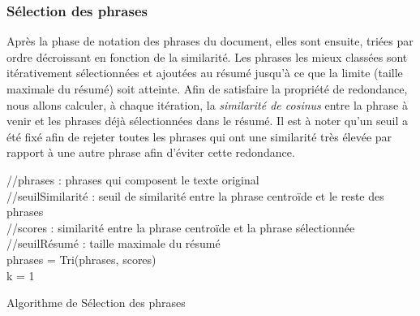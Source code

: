         \subsubsection{Sélection des phrases}
       Après la phase de notation des phrases du document, elles sont ensuite, triées par ordre décroissant en fonction de la similarité. Les phrases les mieux classées sont itérativement sélectionnées et ajoutées au résumé jusqu'à ce que la limite (taille maximale du résumé) soit atteinte. Afin de satisfaire la propriété de redondance, nous allons calculer, à chaque itération, la \emph{similarité de cosinus} entre la phrase à venir et les phrases déjà sélectionnées dans le résumé. Il est à noter qu'un seuil a été fixé afin de rejeter toutes les phrases qui ont une similarité très élevée par rapport à une autre phrase afin d'éviter cette redondance.
        \begin{algorithm2e}[H]
            \SetAlgoLined
            //phrases : phrases qui composent le texte original\\
            //seuilSimilarité : seuil de similarité entre la phrase centroïde et le reste des phrases\\
            //scores : similarité entre la phrase centroïde et la phrase sélectionnée\\
            //seuilRésumé : taille maximale du résumé\\
            phrases = Tri(phrases, scores)\\
            k = 1\\
            \caption{Algorithme de Sélection des phrases}
        \end{algorithm2e}

